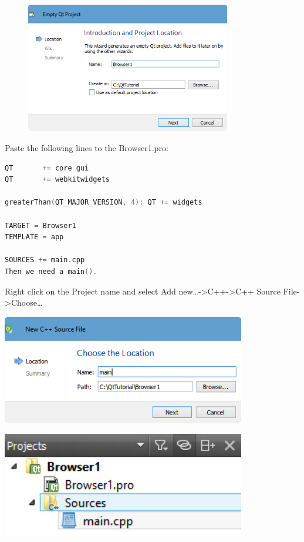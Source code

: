 \begin{figure}[htbp]
\centering
\includegraphics[width=0.8\textwidth]{../manuscript/images/Browser1_Empty_Project}
\caption{}
\end{figure}

Paste the following lines to the Browser1.pro:

\begin{lstlisting}[language=c++, numbers=none]
QT       += core gui
QT       += webkitwidgets

greaterThan(QT_MAJOR_VERSION, 4): QT += widgets

TARGET = Browser1
TEMPLATE = app

SOURCES += main.cpp
Then we need a main().
\end{lstlisting}

Right click on the Project name and select Add
new\ldots{}-\textgreater{}C++-\textgreater{}C++ Source
File-\textgreater{}Choose\ldots{}


\includegraphics[width=0.8\textwidth]{../manuscript/images/main_cpp}

\includegraphics[width=0.8\textwidth]{../manuscript/images/Browser1_files}


